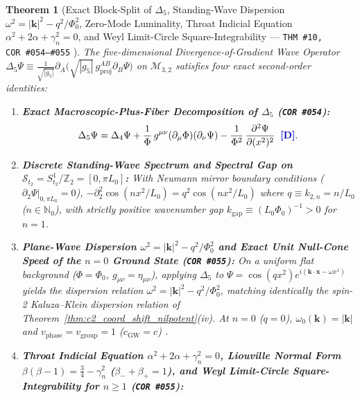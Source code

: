 \documentclass[11pt,a4paper]{article}
\newcommand{\catD}{\text{\textbf{\textcolor{blue!75!black}{[D]}}}}
\theoremstyle{definition}
\theoremstyle{plain}
\newtheorem{theorem}[axiom]{Theorem}
\theoremstyle{remark}
\begin{document}
\begin{theorem}[Exact Block-Split of $\Delta_5$, Standing-Wave Dispersion $\omega^2 = |\mathbf{k}|^2 - q^2/\Phi_0^2$, Zero-Mode Luminality, Throat Indicial Equation $\alpha^2 + 2\alpha + \gamma_n^2 = 0$, and Weyl Limit-Circle Square-Integrability --- \texttt{THM~\#10, COR~\#054--\#055} \catD]\label{thm:c2_wave_operator_properties}\label{thm:c2_laplace_reduction}
The five-dimensional Divergence-of-Gradient Wave Operator $\Delta_5\Psi \equiv \frac{1}{\sqrt{|g_5|}}\partial_A\big(\sqrt{|g_5|}\,g^{AB}_{\mathrm{proj}}\partial_B\Psi\big)$ on $\mathcal{M}_{3,2}$ satisfies four exact second-order identities:
\begin{enumerate}[label=(\roman*)]
  \item \textbf{Exact Macroscopic-Plus-Fiber Decomposition of $\Delta_5$ (\texttt{COR~\#054}):}
  \begin{equation}\label{eq:c2_delta5_split}
  \Delta_5\Psi = \Delta_4\Psi + \frac{1}{\Phi}\,g^{\mu\nu}\!\left(\partial_\mu\Phi\right)\!\left(\partial_\nu\Psi\right) - \frac{1}{\Phi^2}\,\frac{\partial^2\Psi}{\partial(x^2)^2} \;\;\catD.
  \end{equation}
  \item \textbf{Discrete Standing-Wave Spectrum and Spectral Gap on $\mathcal{S}_{t_2} = S^1_{t_2}/\mathbb{Z}_2 = [0, \pi L_0]$:}
  With Neumann mirror boundary conditions ($\partial_2\Psi|_{0,\pi L_0} = 0$), $-\partial_2^2\cos(n x^2/L_0) = q^2\cos(n x^2/L_0)$ where $q \equiv k_{2,n} = n/L_0$ ($n \in \mathbb{N}_0$), with strictly positive wavenumber gap $k_{\mathrm{gap}} \equiv (L_0\Phi_0)^{-1} > 0$ for $n=1$.
  \item \textbf{Plane-Wave Dispersion $\omega^2 = |\mathbf{k}|^2 - q^2/\Phi_0^2$ and Exact Unit Null-Cone Speed of the $n = 0$ Ground State (\texttt{COR~\#055}):}
  On a uniform flat background ($\Phi = \Phi_0$, $g_{\mu\nu} = \eta_{\mu\nu}$), applying $\Delta_5$ to $\Psi = \cos(q x^2)e^{i(\mathbf{k}\cdot\mathbf{x} - \omega x^1)}$ yields the dispersion relation $\omega^2 = |\mathbf{k}|^2 - q^2/\Phi_0^2$, matching identically the spin-2 Kaluza--Klein dispersion relation of Theorem~\ref{thm:c2_coord_shift_nilpotent}(iv). At $n = 0$ ($q = 0$), $\omega_0(\mathbf{k}) = |\mathbf{k}|$ and $v_{\mathrm{phase}} = v_{\mathrm{group}} = 1$ ($c_{\mathrm{GW}} = c$) \catD.
  \item \textbf{Throat Indicial Equation $\alpha^2 + 2\alpha + \gamma_n^2 = 0$, Liouville Normal Form $\beta(\beta - 1) = \frac{3}{4} - \gamma_n^2$ ($\beta_- + \beta_+ = 1$), and Weyl Limit-Circle Square-Integrability for $n \ge 1$ (\texttt{COR~\#055}):}

\end{enumerate}
\end{theorem}
\end{document}

